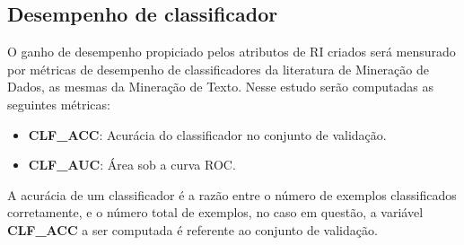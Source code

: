     \subsection{Desempenho de classificador}  \label{subsec:Desempenho-de-classificador}
    O ganho de desempenho propiciado pelos atributos de RI criados será mensurado por métricas de desempenho de classificadores da literatura de Mineração de Dados, as mesmas da Mineração de Texto.
    Nesse estudo serão computadas as seguintes métricas:
    \begin{itemize}
        \item \textbf{CLF\_ACC}: Acurácia do classificador no conjunto de validação.
        \item \textbf{CLF\_AUC}: Área sob a curva ROC.

    \end{itemize}
    A acurácia de um classificador é a razão entre o número de exemplos classificados corretamente, e o número total de exemplos, no caso em questão, a variável \textbf{CLF\_ACC} a ser computada é referente ao conjunto de validação.
    








